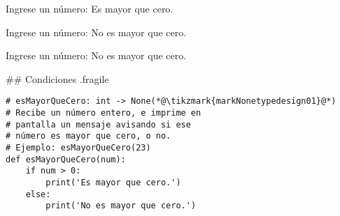 
\vspace{-1ex}


\begin{exampleConsole}
Ingrese un número: 
Es mayor que cero.
\end{exampleConsole}

\fullrule


\begin{exampleConsole}
Ingrese un número: 
No es mayor que cero.
\end{exampleConsole}

\fullrule


\begin{exampleConsole}
Ingrese un número: 
No es mayor que cero.
\end{exampleConsole}

\trmcolumns

## Condiciones {.fragile}


\begin{lstlisting}[style=frame02,linewidth=.65\textwidth]
# esMayorQueCero: int -> None(*@\tikzmark{markNonetypedesign01}@*)
# Recibe un número entero, e imprime en
# pantalla un mensaje avisando si ese
# número es mayor que cero, o no.
# Ejemplo: esMayorQueCero(23)
def esMayorQueCero(num):
    if num > 0:
        print('Es mayor que cero.')
    else:
        print('No es mayor que cero.')
\end{lstlisting}

\pause

\vspace{-3ex}

\pause


\bgncolumns
{}
\vspace{-1ex}


